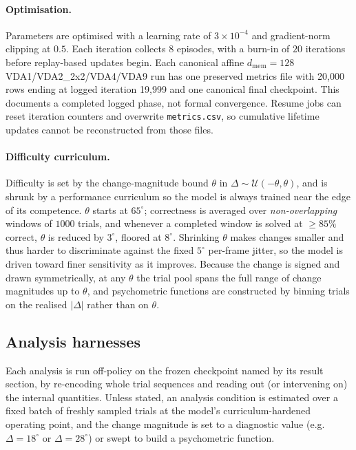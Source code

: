 \paragraph{Optimisation.}
Parameters are optimised with a learning rate of $3\times10^{-4}$ and
gradient-norm clipping at $0.5$. Each iteration collects $8$ episodes, with a
burn-in of $20$ iterations before replay-based updates begin. Each canonical
affine $d_{\mathrm{mem}}=128$ VDA1/VDA2\_2x2/VDA4/VDA9 run has one preserved metrics file with
20{,}000 rows ending at logged iteration 19{,}999 and one canonical final
checkpoint. This documents a completed logged phase, not formal convergence.
Resume jobs can reset iteration counters and overwrite \texttt{metrics.csv}, so
cumulative lifetime updates cannot be reconstructed from those files.

\paragraph{Difficulty curriculum.}
\label{sec:methods-curriculum}
Difficulty is set by the change-magnitude bound $\theta$ in
$\Delta \sim \mathcal{U}(-\theta, \theta)$, and is shrunk by a performance
curriculum so the model is always trained near the edge of its competence.
$\theta$ starts at $65^\circ$; correctness is averaged over
\emph{non-overlapping} windows of $1000$ trials, and whenever a completed
window is solved at $\geq 85\%$ correct, $\theta$ is reduced by $3^\circ$,
floored at $8^\circ$. Shrinking $\theta$ makes changes smaller and thus
harder to discriminate against the fixed $5^\circ$ per-frame jitter, so the
model is driven toward finer sensitivity as it improves. Because the
change is signed and drawn symmetrically, at any $\theta$ the trial pool
spans the full range of change magnitudes up to $\theta$, and psychometric
functions are constructed by binning trials on the realised $|\Delta|$
rather than on $\theta$.

\subsection{Analysis harnesses}
\label{sec:methods-analysis}

Each analysis is run off-policy on the frozen checkpoint named by its result
section, by re-encoding whole trial sequences and reading out (or intervening on)
the internal quantities. Unless stated, an analysis condition is estimated
over a fixed batch of freshly sampled trials at the model's
curriculum-hardened operating point, and the change magnitude is set to a
diagnostic value (e.g.\ $\Delta = 18^\circ$ or $\Delta = 28^\circ$) or
swept to build a psychometric function.

